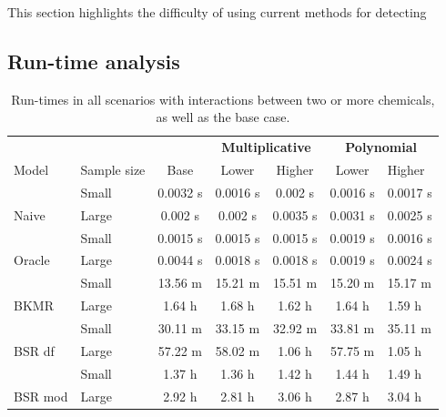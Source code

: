 \documentclass[12pt, twoside]{amherstthesis}
\begin{document}
This section highlights the difficulty of using current methods for detecting

\hypertarget{run-time-analysis}{%
\subsection{Run-time analysis}\label{run-time-analysis}}
\begin{table}

\caption{\label{tab:runtimes}Run-times in all scenarios with interactions between two or more chemicals, as well as the base case.}
\centering
\begin{tabular}[t]{llccccl}
\toprule
\multicolumn{3}{c}{\textbf{ }} & \multicolumn{2}{c}{\textbf{Multiplicative}} & \multicolumn{2}{c}{\textbf{Polynomial}} \\
\cmidrule(l{3pt}r{3pt}){4-5} \cmidrule(l{3pt}r{3pt}){6-7}
Model & Sample size & Base & Lower & Higher & Lower & Higher\\
\midrule
 & Small & 0.0032 s & 0.0016 s & 0.002 s & 0.0016 s & 0.0017 s\\

\multirow{-2}{*}{\raggedright\arraybackslash Naive} & Large & 0.002 s & 0.002 s & 0.0035 s & 0.0031 s & 0.0025 s\\
\addlinespace
 & Small & 0.0015 s & 0.0015 s & 0.0015 s & 0.0019 s & 0.0016 s\\

\multirow{-2}{*}{\raggedright\arraybackslash Oracle} & Large & 0.0044 s & 0.0018 s & 0.0018 s & 0.0019 s & 0.0024 s\\
\addlinespace
 & Small & 13.56 m & 15.21 m & 15.51 m & 15.20 m & 15.17 m\\

\multirow{-2}{*}{\raggedright\arraybackslash BKMR} & Large & 1.64 h & 1.68 h & 1.62 h & 1.64 h & 1.59 h\\
\addlinespace
 & Small & 30.11 m & 33.15 m & 32.92 m & 33.81 m & 35.11 m\\

\multirow{-2}{*}{\raggedright\arraybackslash BSR df} & Large & 57.22 m & 58.02 m & 1.06 h & 57.75 m & 1.05 h\\
\addlinespace
 & Small & 1.37 h & 1.36 h & 1.42 h & 1.44 h & 1.49 h\\

\multirow{-2}{*}{\raggedright\arraybackslash BSR mod} & Large & 2.92 h & 2.81 h & 3.06 h & 2.87 h & 3.04 h\\
\bottomrule
\end{tabular}
\end{table}
\end{document}
